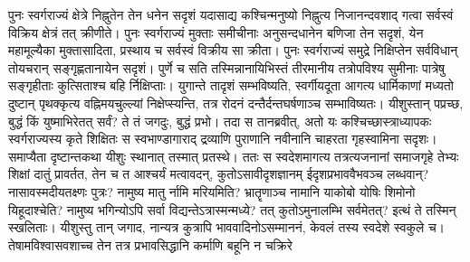\vakya पुनः स्वर्गराज्यं क्षेत्रे निह्नुतेन तेन धनेन सदृशं यदासाद्य कश्चिन्मनुष्यो निह्नुत्य निजानन्दवशाद् गत्वा सर्वस्वं विक्रिय क्षेत्रं तत् क्रीणीते।
\vakya पुनः स्वर्गराज्यं मुक्ताः समीचीनाः अनुसन्दधानेन बणिजा तेन सदृशं,
\vakya येन महामूल्यैका मुक्तासादिता, प्रस्थाय च सर्वस्वं विक्रीय सा क्रीता।
\vakya पुनः स्वर्गराज्यं समुद्रे निक्षिप्तेन सर्वविधान् तोयचरान् सङ्गृह्णतानायेन सदृशं।
\vakya पुर्णे च सति तस्मिन्नानायिभिस्तं तीरमानीय तत्रोपविश्य सुमीनाः पात्रेषु सङ्गृहीताः कुत्सिताश्च बहि र्निक्षिप्ताः।
\vakya युगान्ते तादृशं सम्भविष्यति, स्वर्गीयदूता आगत्य धार्मिकाणां मध्यतो दुष्टान् पृथक्कृत्य वह्निमयचुल्ल्यां निक्षेप्स्यन्ति,
\vakya तत्र रोदनं दन्तैर्दन्तघर्षणाञ्च सम्भाविष्यतः।
\vakya यीशुस्तान् पप्रच्छ, बुद्धं किं युष्माभिरेतत् सर्वं? ते तं जगदुः, बुद्धं प्रभो।
\vakya तदा स तानब्रवीत्, अतो यः कश्चिच्छास्त्राध्यापकः स्वर्गराज्यस्य कृते शिक्षितः स स्वभाण्डागाराद् द्रव्याणि पुराणानि नवीनानि चाहरता गृहस्वामिना सदृशः।
\vakya समाप्यैता दृष्टान्तकथा यीशुः स्थानात् तस्मात् प्रतस्थे।
\vakya ततः स स्वदेशमागत्य तत्रत्यजनानां समाजगृहे तेभ्यः शिक्षां दातुं प्रावर्तत, तेन च त आश्चर्यं मत्वावदन्, कुतोऽसावीदृशज्ञानम् ईदृशप्रभाववैभवञ्च लब्धवान्?
\vakya नासावस्मदीयतक्ष्णः पुत्रः? नामुष्य मातु र्नामि मरियमिति? भ्रातॄणाञ्च नामानि याकोबो योषिः शिमोनो यिहूदाश्चेति?
\vakya नामुष्य भगिन्योऽपि सर्वा विद्यन्तेऽत्रास्मन्मध्ये? तत् कुतोऽमुनालम्भि सर्वमेतत्?
\vakya इत्थं ते तस्मिन् स्खलिताः। यीशुस्तु तान् जगाद, नान्यत्र कुत्रापि भाववादिनोऽसम्माननं, केवलं तस्य स्वदेशे स्वकुले च।
\vakya तेषामविश्वासवशाच्च तेन तत्र प्रभावसिद्धानि कर्माणि बहूनि न चक्रिरे\eoc